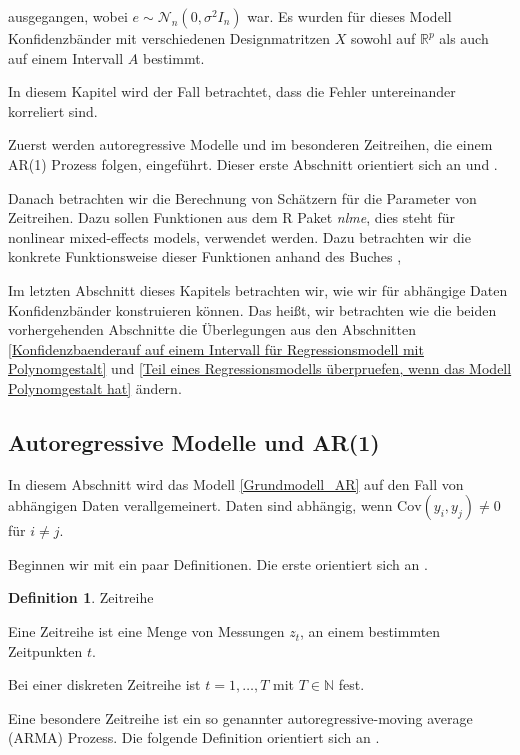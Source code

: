 \documentclass[12pt,a4paper]{article}
\theoremstyle{definition}
\newtheorem{Definition}{Definition}[subsection]
\theoremstyle{definition}
\theoremstyle{definition}
\theoremstyle{definition}
\begin{document}
ausgegangen, wobei $e \sim \mathscr{N}_{n}(0, \sigma^2 I_n)$ war.  Es wurden für dieses Modell Konfidenzbänder mit verschiedenen Designmatritzen $X$ sowohl auf $\mathbb{R}^{p}$ als auch auf einem Intervall $A$ bestimmt.

In diesem Kapitel wird der Fall betrachtet, dass die Fehler untereinander korreliert sind. 

Zuerst werden autoregressive Modelle und im besonderen Zeitreihen, die einem AR(1) Prozess folgen, eingeführt. Dieser erste Abschnitt orientiert sich an \cite{Hansen15} und \cite{Brockwell91}.

Danach betrachten wir die Berechnung von Schätzern für die Parameter von Zeitreihen. Dazu sollen Funktionen aus dem R Paket \textit{nlme}, dies steht für nonlinear mixed-effects models, verwendet werden. Dazu betrachten wir die konkrete Funktionsweise dieser Funktionen anhand des Buches \cite{Pinheiro00},

Im letzten Abschnitt dieses Kapitels betrachten wir, wie wir für abhängige Daten Konfidenzbänder konstruieren können. Das heißt, wir betrachten wie die beiden vorhergehenden Abschnitte die Überlegungen aus den Abschnitten \ref{Konfidenzbaenderauf auf einem Intervall für Regressionsmodell mit Polynomgestalt} und \ref{Teil eines Regressionsmodells überpruefen, wenn das Modell Polynomgestalt hat} ändern.


\subsection{Autoregressive Modelle und AR(1)}
\label{Regression für AR(1)}
In diesem Abschnitt wird das Modell \eqref{Grundmodell_AR} auf den Fall von abhängigen Daten verallgemeinert. Daten sind abhängig, wenn $\text{Cov}(y_i,y_j) \neq 0$ für $i \neq j$.

Beginnen wir mit ein paar Definitionen. Die erste orientiert sich an \cite[1]{Brockwell91}.

\begin{Definition}
Zeitreihe

Eine Zeitreihe ist eine Menge von Messungen $z_t$, an einem bestimmten Zeitpunkten $t$. 

Bei einer diskreten Zeitreihe ist $ t=1, \ldots, T $ mit $T \in \mathbb{N}$ fest. 

\end{Definition}

Eine besondere Zeitreihe ist ein so genannter autoregressive-moving average (ARMA) Prozess. Die folgende Definition orientiert sich an \cite[78]{Brockwell91}.
\end{document}
